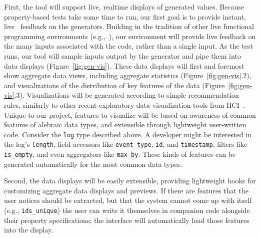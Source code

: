 First, the tool will support live, realtime displays of generated values.
Because property-based tests take some time to run, our first goal is to provide
instant, live~\cite{ref:tanimoto1990viva} feedback on the generators. Building
in the tradition of other live functional programming environments
(e.g.,~\cite{tool:lighttable,ref:omar2019live}), our environment will provide
live feedback on the many inputs associated with the code, rather than a single
input. As the test runs, our tool will sample inputs output by the generator and
pipe them into data displays (Figure~\ref{fig:gen-vis}). These data displays
will first and foremost show aggregate data views, including aggregate
statistics (Figure~\ref{fig:gen-vis}.2), and visualizations of the distribution
of key features of the data (Figure~\ref{fig:gen-vis}.3). Visualizations will be
generated according to simple recommendation rules, similarly to other recent
exploratory data visualization tools from
HCI~\cite{ref:lee2021lux,wongsuphasawat_voyager_2016,
wongsuphasawat_voyager_2017}. Unique to our project, features to visualize will
be based on awareness of common features of alebraic data types, and extensible
through lightweight user-written code. Consider the \lstinline{log} type
described above. A developer might be interested in the log's
\lstinline{length}, field accessors like \lstinline{event_type}, \lstinline{id},
and \lstinline{timestamp}, filters like \lstinline{is_empty}, and even
aggregators like \lstinline{max_by}. These kinds of features can be generated
automatically for the most common data types.

Second, the data displays will be easily extensible, providing lightweight hooks
for customizing aggregate data displays and previews. If
there are features that the user notices should be extracted, but that the
system cannot come up with itself (e.g., \lstinline{ids_unique}) the user can
write it themselves in companion code alongside their property specifications;
the interface will automatically load those features into the display.

